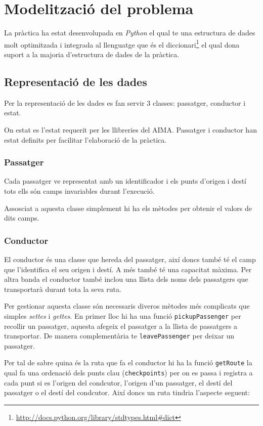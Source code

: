 \section{Modelització del problema}
La pràctica ha estat desenvolupada en \emph{Python} el qual te una estructura de dades molt optimitzada
i integrada al llenguatge que és el diccionari\footnote{\url{http://docs.python.org/library/stdtypes.html\#dict}}
el qual dona suport a la majoria d'estructura de dades de la pràctica.

\subsection{Representació de les dades}
Per la representació de les dades es fan servir 3 classes: passatger, conductor i estat.

On estat es l'estat requerit per les llibreries del AIMA. Passatger i conductor han estat
definits per facilitar l'elaboració de la pràctica.

\subsubsection{Passatger}
Cada passatger ve representat amb un identificador i els punts d'origen i destí tots ells són
camps invariables durant l'execució.

Assosciat a aquesta classe simplement hi ha els mètodes per obtenir el valors de dits camps.

\subsubsection{Conductor}
El conductor és una classe que hereda del passatger, així doncs també té el camp que l'identifica
el seu origen i destí. A més també té una capacitat màxima.
Per altra banda el conductor també inclou una llista dels noms dels passatgers que transportarà
durant tota la seva ruta.

Per gestionar aquesta classe són necessaris diveros mètodes més complicats que simples \emph{settes} i \emph{gettes}.
En primer lloc hi ha una funció \texttt{pickupPassenger} per recollir un passatger, aquesta afegeix el passatger
a la llista de passatgers a transportar. De manera complementària te \texttt{leavePassenger} per deixar un 
passatger.

Per tal de sabre quina és la ruta que fa el conductor hi ha la funció \texttt{getRoute} la qual
fa una ordenació dels punts clau (\texttt{checkpoints}) per on es passa i registra a cada punt si es
l'origen del condcutor, l'origen d'un passatger, el destí del passatger o el destí del condcutor. Així
doncs un ruta tindria l'aspecte seguent: 

